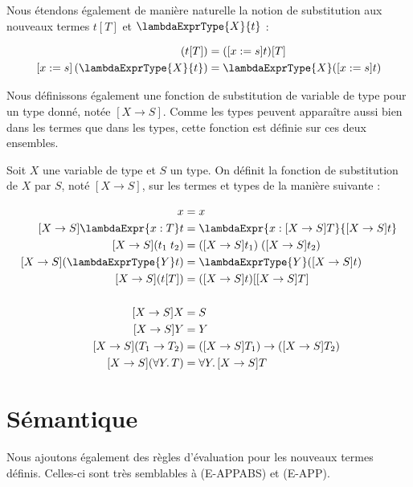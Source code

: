Nous étendons également de manière naturelle la notion de substitution aux
nouveaux termes $t[T]$ et $\lambdaExprType{X}{t}$ :

\begin{align*}
  [x := s] \, (t[T]) & = ([x := s]t)[T] \\
  [x := s] \, (\lambdaExprType{X}{t}) & = \lambdaExprType{X}([x := s]t)
\end{align*}

Nous définissons également une fonction de substitution de variable de type pour
un type donné, notée $[X \rightarrow S]$. Comme les types peuvent apparaître
aussi bien dans les termes que dans les types, cette fonction est définie sur
ces deux ensembles.

\begin{definition}
  Soit $X$ une variable de type et $S$ un type. On définit la fonction de
  substitution de $X$ par $S$, noté $[X \rightarrow S]$, sur les termes et types
  de la manière suivante :

  \begin{align*}
    [X \rightarrow S]x & = x \\
    [X \rightarrow S]\lambdaExpr{x : T} t & = \lambdaExpr{x : [X \rightarrow S]T}{[X \rightarrow S]t} \\
    [X \rightarrow S](t_{1} \; t_{2}) & = ([X \rightarrow S]t_{1}) \; ([X \rightarrow S]t_{2}) \\
    [X \rightarrow S](\lambdaExprType{Y} t) & = \lambdaExprType{Y}([X \rightarrow S] t) \\
    [X \rightarrow S](t[T]) & = ([X \rightarrow S] t)[[X \rightarrow S] T] \\
    \\
    [X \rightarrow S]X & = S \\
    [X \rightarrow S]Y & = Y \\
    [X \rightarrow S](T_{1} \rightarrow T_{2}) & = ([X \rightarrow S]T_{1}) \rightarrow ([X \rightarrow S] T_{2}) \\
    [X \rightarrow S](\forall Y .\, T) & = \forall Y . \, [X \rightarrow S]T
  \end{align*}
\end{definition}
\section{Sémantique}

Nous ajoutons également des règles d'évaluation pour les nouveaux termes
définis. Celles-ci sont très semblables à (E-APPABS) et (E-APP).

